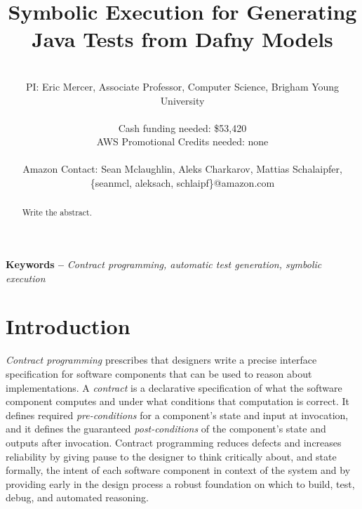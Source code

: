 \documentclass[11pt,onecolumn,notitlepage]{article}
\makeatletter
\renewcommand{\maketitle}{\bgroup\setlength{\parindent}{0pt}
\begin{flushleft}
  \Large{\textbf{\@title}}
  
  \normalsize{\@author}
\end{flushleft}\egroup
}
\makeatother
\begin{document}
\title{Symbolic Execution for Generating Java Tests from Dafny Models}
\author{\hfill \\
        PI: Eric Mercer, Associate Professor, Computer Science, Brigham Young University\\
        \hfill \\
        Cash funding needed: \$53,420 \\
        AWS Promotional Credits needed: none\\
        \hfill \\
        Amazon Contact: Sean Mclaughlin, Aleks Charkarov, Mattias Schalaipfer, \{seanmcl, aleksach, schlaipf\}@amazon.com}

\maketitle

\begin{abstract}
  Write the abstract.
\end{abstract}

\providecommand{\keywords}[1]{\noindent\textbf{Keywords -- } \textit{#1}}
\keywords{Contract programming, automatic test generation, symbolic execution}

\section*{Introduction}
\emph{Contract programming} prescribes that designers write a precise interface specification for software components that can be used to reason about implementations. A \emph{contract} is a declarative specification of what the software component computes and under what conditions that computation is correct. It defines required \emph{pre-conditions} for a component's state and input at invocation, and it defines the guaranteed \emph{post-conditions} of the component's state and outputs after invocation. Contract programming reduces defects and increases reliability by giving pause to the designer to think critically about, and state formally, the intent of each software component in context of the system and by providing early in the design process a robust foundation on which to build, test, debug, and automated reasoning. 
\end{document}
